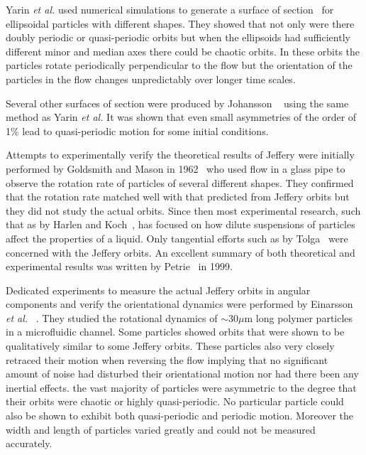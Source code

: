 Yarin \emph{et al.} used numerical simulations to generate a surface of section~\cite{SurfaceOfSection} for ellipsoidal particles with different shapes. They showed that not only were there doubly periodic or quasi-periodic orbits but when the ellipsoids had sufficiently different minor and median axes there could be chaotic orbits. In these orbits the particles rotate periodically perpendicular to the flow but the orientation of the particles in the flow changes unpredictably over longer time scales. %

Several other surfaces of section were produced by Johansson ~\cite{AntonThesis} using the same method as Yarin \emph{et al.} It was shown that even small asymmetries of the order of 1\% lead to quasi-periodic motion for some initial conditions.

Attempts to experimentally verify the theoretical results of Jeffery were initially performed by Goldsmith and Mason in 1962~\cite{Mason} who used flow in a glass pipe to observe the rotation rate of particles of several different shapes. They confirmed that the rotation rate matched well with that predicted from Jeffery orbits but they did not study the actual orbits. Since then most experimental research, such that as by Harlen and Koch~\cite{fibersspension}, has focused on how dilute suspensions of particles affect the properties of a liquid. Only tangential efforts such as by Tolga~\cite{Tolga} were concerned with the Jeffery orbits. An excellent summary of both theoretical and experimental results was written by Petrie~\cite{Petrie} in 1999.

Dedicated experiments to measure the actual Jeffery orbits in angular components and verify the orientational dynamics were performed by Einarsson \emph{et al.} ~\cite{JonasExperiment}. They studied the rotational dynamics of $\sim 30 \mu$m long polymer particles in a microfluidic channel. Some particles showed orbits that were shown to be qualitatively similar to some Jeffery orbits. These particles also very closely retraced their motion when reversing the flow implying that no significant amount of noise had disturbed their orientational motion nor had there been any inertial effects. the vast majority of particles were asymmetric to the degree that their orbits were chaotic or highly quasi-periodic. No particular particle could also be shown to exhibit both quasi-periodic and periodic motion. Moreover the width and length of particles varied greatly and could not be measured accurately.

